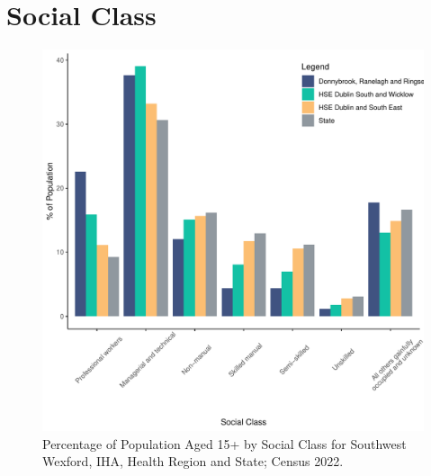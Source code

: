 \documentclass{article}
\begin{document}
\section{Social Class}\label{sect:SC}
\begin{figure}[H]
	\centering
	\includegraphics[width = 140mm]{../figures/SocialClassED.pdf}
	\caption{Percentage of Population Aged 15+ by Social Class for Southwest Wexford, IHA, Health Region and State; Census 2022.}
	\label{fig:vbnv}
	\end{figure}
\end{document}
